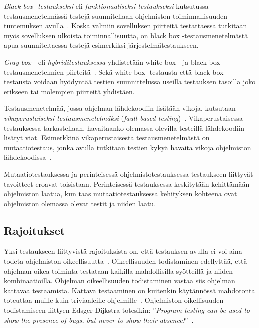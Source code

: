 \documentclass[finnish, grading]{tktltiki2}
\theoremstyle{definition}
\theoremstyle{remark}
\begin{document}
\textit{Black box -testaukseksi} eli \textit{funktionaaliseksi testaukseksi} kutsutussa testausmenetelmässä testejä suunnitellaan ohjelmiston toiminnallisuuden tuntemuksen avulla~\cite[s. 51-52]{Binder:1999}. Koska valmiin sovelluksen piirteitä testattaessa tutkitaan myös sovelluksen ulkoista toiminnallisuutta, on black box -testausmenetelmästä apua suunniteltaessa testejä esimerkiksi järjestelmätestaukseen.

\textit{Gray box -} eli \textit{hybriditestauksessa} yhdistetään white box - ja black box -testausmenetelmien piirteitä~\cite[s. 52]{Binder:1999}. Sekä white box -testausta että black box -testausta voidaan hyödyntää testien suunnittelussa useilla testauksen tasoilla joko erikseen tai molempien piirteitä yhdistäen.

Testausmenetelmää, jossa ohjelman lähdekoodiin lisätään vikoja, kutsutaan \textit{vikaperustaiseksi testausmenetelmäksi} (\textit{fault-based testing})~\cite[s. 52]{Binder:1999}. Vikaperustaisessa testauksessa tarkastellaan, havaitaanko olemassa olevilla testeillä lähdekoodiin lisätyt viat. Esimerkkinä vikaperustaisesta testausmenetelmästä on mutaatiotestaus, jonka avulla tutkitaan testien kykyä havaita vikoja ohjelmiston lähdekoodissa~\cite[s. 36]{DeMillo:Lipton:Sayward:1978}. 

Mutaatiotestauksessa ja perinteisessä ohjelmistotestauksessa testaukseen liittyvät tavoitteet eroavat toisistaan. Perinteisessä testauksessa keskitytään kehittämään ohjelmiston laatua, kun taas mutaatiotestauksessa kehityksen kohteena ovat ohjelmiston olemassa olevat testit ja niiden laatu.

\subsection{Rajoitukset}

Yksi testaukseen liittyvistä rajoituksista on, että testauksen avulla ei voi aina todeta ohjelmiston oikeellisuutta~\cite[s. 58]{Binder:1999}. Oikeellisuuden todistaminen edellyttää, että ohjelman oikea toiminta testataan kaikilla mahdollisilla syötteillä ja niiden kombinaatioilla. Ohjelman oikeellisuuden todistaminen vastaa siis ohjelman kattavaa testaamista. Kattava testaaminen on kuitenkin käytännössä mahdotonta toteuttaa muille kuin triviaaleille ohjelmille~\cite[s. 58]{Binder:1999}. Ohjelmiston oikellisuuden todistamiseen liittyen Edsger Dijkstra totesikin: ''\textit{Program testing can be used to show the presence of bugs, but never to show their absence!}''~\cite[s. 6]{Dahl:Dijkstra:Hoare:1972}.
\end{document}
